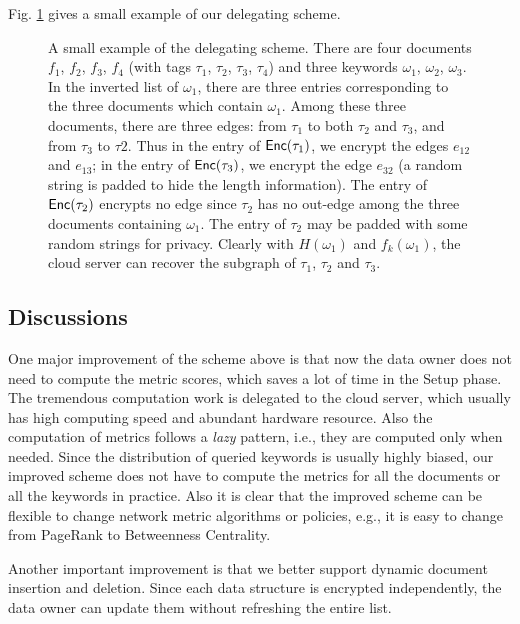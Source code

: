 \documentclass{IEEEtran}
\begin{document}
Fig. \ref{fig:gl} gives a small example of our delegating scheme.

\begin{figure}[!t]
\centering
\begin{tikzpicture}[scale=.9]

\end{tikzpicture}
\caption{A small example of the delegating scheme. There are four documents $f_1$, $f_2$, $f_3$, $f_4$ (with tags $\tau_1$, $\tau_2$, $\tau_3$, $\tau_4$) and three keywords $\omega_1$, $\omega_2$, $\omega_3$. In the inverted list of $\omega_1$, there are three entries corresponding to the three documents which contain $\omega_1$. Among these three documents, there are three edges: from $\tau_1$ to both $\tau_2$ and $\tau_3$, and from $\tau_3$ to $\tau2$. Thus in the entry of $\Enc(\tau_1)$, we encrypt the edges $e_{12}$ and $e_{13}$; in the entry of $\Enc(\tau_3)$, we encrypt the edge $e_{32}$ (a random string is padded to hide the length information). The entry of $\Enc(\tau_2)$ encrypts no edge since $\tau_2$ has no out-edge among the three documents containing $\omega_1$. The entry of $\tau_2$ may be padded with some random strings for privacy. Clearly with $H(\omega_1)$ and $f_k(\omega_1)$, the cloud server can recover the subgraph of $\tau_1$, $\tau_2$ and $\tau_3$.}
\label{fig:gl}
\end{figure}

\subsection{Discussions}
One major improvement of the scheme above is that now the data owner does not need to compute the metric scores, which saves a lot of time in the Setup phase. The tremendous computation work is delegated to the cloud server, which usually has high computing speed and abundant hardware resource. Also the computation of metrics follows a \emph{lazy} pattern, i.e., they are computed only when needed. Since the distribution of queried keywords is usually highly biased, our improved scheme does not have to compute the metrics for all the documents or all the keywords in practice. Also it is clear that the improved scheme can be flexible to change network metric algorithms or policies, e.g., it is easy to change from PageRank to Betweenness Centrality.

Another important improvement is that we better support dynamic document insertion and deletion. Since each data structure is encrypted independently, the data owner can update them without refreshing the entire list.



\end{document}
